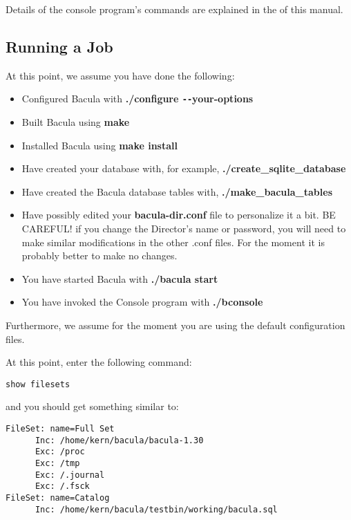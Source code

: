 {{Details of the console program's commands are explained in the 
 of this manual. 

\subsection*{Running a Job}
\label{Running}

At this point, we assume you have done the following: 

\begin{itemize}
\item Configured Bacula with {\bf ./configure \verb{--{your-options} 
\item Built Bacula using {\bf make} 
\item Installed Bacula using {\bf make install} 
\item Have created your database with, for example,  {\bf
   ./create\_sqlite\_database} 
\item Have created the Bacula database tables with,  {\bf
   ./make\_bacula\_tables} 
\item Have possibly edited your {\bf bacula-dir.conf} file  to personalize it
   a bit. BE CAREFUL! if you change the  Director's name or password, you will
   need to make similar  modifications in the other .conf files. For the moment
it is  probably better to make no changes.  
\item You have started Bacula with {\bf ./bacula start}  
\item You have invoked the Console program with {\bf ./bconsole} 
   \end{itemize}

Furthermore, we assume for the moment you are using the default configuration
files. 

At this point, enter the following command: 

\footnotesize
\begin{verbatim}
show filesets
\end{verbatim}
\normalsize

and you should get something similar to: 

\footnotesize
\begin{verbatim}
FileSet: name=Full Set
      Inc: /home/kern/bacula/bacula-1.30
      Exc: /proc
      Exc: /tmp
      Exc: /.journal
      Exc: /.fsck
FileSet: name=Catalog
      Inc: /home/kern/bacula/testbin/working/bacula.sql
\end{verbatim}
\normalsize

}}
